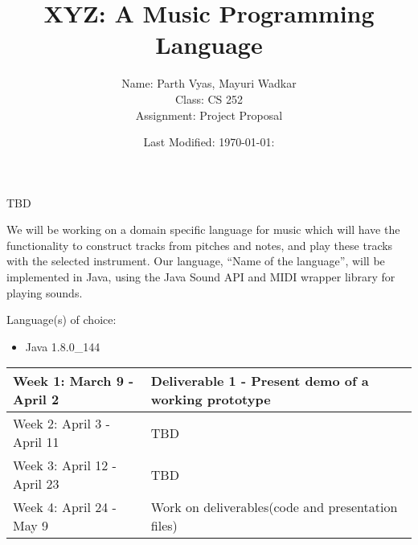 \documentclass{article}
\title{XYZ: A Music Programming Language}
\author {
  Name:  Parth Vyas, Mayuri Wadkar\\
  Class: CS 252 \\
  Assignment: Project Proposal \\
}
\date{Last Modified: {\today}:{\currenttime}}
\begin{document}
    \maketitle

    \begin{flushleft}
    {
     	TBD
    }  
    \end{flushleft}

    \begin{flushleft}
      {
        We will be working on a domain specific language for music which will have the functionality to construct tracks from pitches and notes, and play these tracks with the selected instrument. Our language, “Name of the language”, will be implemented in Java, using the Java Sound API and MIDI wrapper library for playing sounds. 
        
        Language(s) of choice:
        \begin{itemize}
          \item Java 1.8.0\_144
         
        \end{itemize}
      }
    \end{flushleft}
    {
      \newcommand{\schedule}[2]{
        \hline
        #1 & #2
        \\
        \hline
      }

      \begin{center}
        \begin{table}[!th]
          \begin{tabular}{|L|L|}
            \schedule{Week 1: March 9 - April 2}{Deliverable 1 - Present demo of a working prototype}
            \schedule{Week 2: April 3 - April 11}{TBD}
            \schedule{Week 3: April 12 - April 23}{TBD}
            \schedule{Week 4: April 24 - May 9}{Work on deliverables(code and presentation files)}
          \end{tabular}
        \end{table}  
      \end{center}
    }

    {}
    
\end{document}
